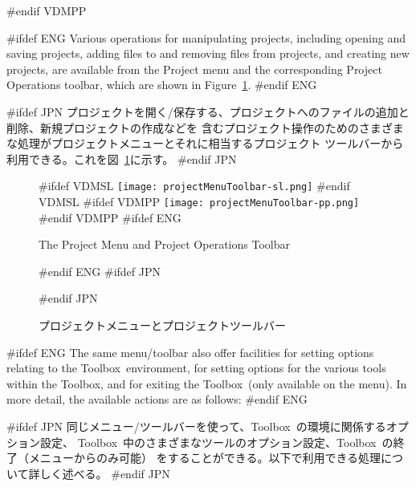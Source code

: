 \documentclass[\pformat,12pt]{article}
\newcommand{\Toolbox}{Toolbox}
\newcommand{\Toolbox}{Toolbox}
\newcommand{\guicmd}[1]{{\sf #1}}
\newcommand{\guicmd}[1]{{\gt #1}}
\begin{document}
#endif VDMPP

#ifdef ENG
Various operations for manipulating projects, including opening and
saving projects, adding files to and removing files from projects, and
creating new projects, are available from the \guicmd{Project}
menu and the corresponding \guicmd{Project
  Operations} toolbar, which are
shown in Figure~\ref{fig:projectMenuToolbar}.
#endif ENG

#ifdef JPN
プロジェクトを開く/保存する、プロジェクトへのファイルの追加と削除、新規プロジェクトの作成などを
含むプロジェクト操作のためのさまざまな処理が\guicmd{プロジェクト}メニューとそれに相当する\guicmd{プロジェクト}
ツールバーから利用できる。これを図~\ref{fig:projectMenuToolbar}に示す。
#endif JPN

\begin{figure}[tbh]
\begin{center}
\mbox{}
#ifdef VDMSL
\texttt{[image: projectMenuToolbar-sl.png]}
#endif VDMSL
#ifdef VDMPP
\texttt{[image: projectMenuToolbar-pp.png]}
#endif VDMPP
#ifdef ENG
\caption{The Project Menu and Project Operations Toolbar}
#endif ENG
#ifdef JPN
\caption{プロジェクトメニューとプロジェクトツールバー}
#endif JPN
\label{fig:projectMenuToolbar}
\end{center}
\end{figure}

#ifdef ENG
The same menu/toolbar also offer facilities for setting options
relating to the \Toolbox\ environment, for setting options for the
various tools within the \Toolbox, and for exiting the \Toolbox\
(only available on the menu). In more  detail, the available actions
are as follows:
#endif ENG

#ifdef JPN
同じメニュー/ツールバーを使って、\Toolbox\ の環境に関係するオプション設定、
\Toolbox\ 中のさまざまなツールのオプション設定、\Toolbox\ の終了（メニューからのみ可能）
をすることができる。以下で利用できる処理について詳しく述べる。
#endif JPN
\end{document}
